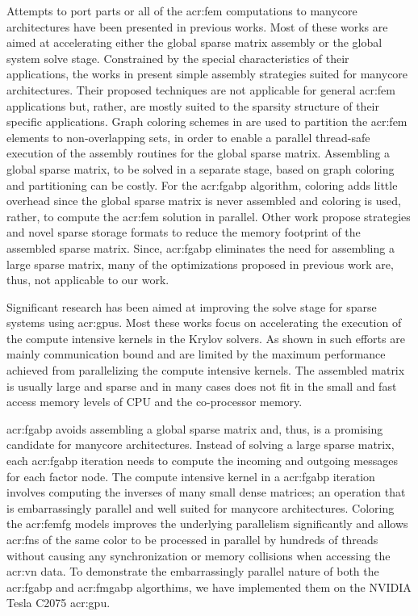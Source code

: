 Attempts to port parts or all of the \gls{acr:fem} computations to manycore architectures have been presented in previous works.
Most of these works are aimed at accelerating either the global sparse matrix assembly or the global system solve stage.
Constrained by the special characteristics of their applications, the works in \cite{bib:Bolz2003SMSGPUs,bib:rodriguez2006NSM} present simple assembly strategies suited for manycore architectures.
Their proposed techniques are not applicable for general \gls{acr:fem} applications but, rather, are mostly suited to the sparsity structure of their specific applications.
Graph coloring schemes in \cite{bib:Komatitsch2009PHF,bib:Hesthaven2007NDG,bib:Cris2011assemblyGPU} are used to partition the \gls{acr:fem} elements to non-overlapping sets, in order to enable a parallel thread-safe execution of the assembly routines for the global sparse matrix.
Assembling a global sparse matrix, to be solved in a separate stage, based on graph coloring and partitioning can be costly.
For the \gls{acr:fgabp} algorithm, coloring adds little overhead since the global sparse matrix is never assembled and coloring is used, rather, to compute the \gls{acr:fem} solution in parallel.
Other work \cite{bib:Dziekonski2013generation,bib:Dziekonski2012finite,bib:Fu2014architecting} propose strategies and novel sparse storage formats to reduce the memory footprint of the assembled sparse matrix.
Since, \gls{acr:fgabp} eliminates the need for assembling a large sparse matrix, many of the optimizations proposed in previous work are, thus, not applicable to our work.

Significant research has been aimed at improving the solve stage for sparse systems using \glspl{acr:gpu}.
Most these works focus on accelerating the execution of the compute intensive kernels in the Krylov solvers.
As shown in \cite{bib:Hoemmen2010EECS,bib:Mehridehnavi2013CAGPU} such efforts are mainly communication bound and are limited by the maximum performance achieved from parallelizing the compute intensive kernels.
The assembled matrix is usually large and sparse and in many cases does not fit in the small and fast access memory levels of CPU and the co-processor memory.


\gls{acr:fgabp} avoids assembling a global sparse matrix and, thus, is a promising candidate for manycore architectures.
Instead of solving a large sparse matrix, each \gls{acr:fgabp} iteration needs to compute the incoming and outgoing messages for each factor node.
The compute intensive kernel in a \gls{acr:fgabp} iteration involves computing the inverses of many small dense matrices; an operation that is embarrassingly parallel and well suited for manycore architectures.
Coloring the \gls{acr:femfg} models improves the underlying parallelism significantly and allows \glspl{acr:fn} of the same color to be processed in parallel by hundreds of threads without causing any synchronization or memory collisions when accessing the \gls{acr:vn} data.
To demonstrate the embarrassingly parallel nature of both the \gls{acr:fgabp} and \gls{acr:fmgabp} algorthims, we have implemented them on the {NVIDIA} Tesla {C2075} \gls{acr:gpu}.


